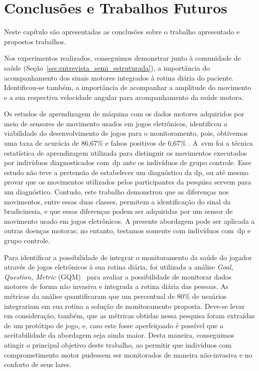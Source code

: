 \chapter{Conclusões e Trabalhos Futuros}\label{chapter:conclusoes_futuros}
Neste capítulo são apresentadas as conclusões sobre o trabalho apresentado e propostos trabalhos.  


Nos experimentos realizados, conseguimos demonstrar junto à comunidade de saúde (Seção~\ref{sec:entrevista_semi_estruturada}), a importância do acompanhamento dos sinais motores integrados à rotina diária do paciente. Identificou-se também, a importância de acompanhar a amplitude do movimento e a sua respectiva velocidade angular para acompanhamento da saúde motora.

Os estudos de aprendizagem de máquina com os dados motores adquiridos por meio de sensores de movimento usados em jogos eletrônicos, identificou a viabilidade do desenvolvimento de jogos para o monitoramento, pois, obtivemos uma taxa de acurácia de 86,67\% e falsos positivos de 6,67\% . A~\ac{svm} foi a técnica estatística de aprendizagem utilizada para distinguir os movimentos executados por indivíduos diagnosticados com~\ac{dp} ante os indivíduos de grupo controle. Esse estudo não teve a pretensão de estabelecer um diagnóstico da \ac{dp}, ou até mesmo provar que os movimentos utilizados pelos participantes da pesquisa servem para um diagnóstico. Contudo, este trabalho demonstrou que as diferenças nos movimentos, entre essas duas classes, permitem a identificação do sinal da bradicinesia, e que essas diferenças podem ser adquiridas por um sensor de movimento usado em jogos eletrônicos. A presente abordagem pode ser aplicada a outras doenças motoras; no entanto, testamos somente com indivíduos com~\ac{dp} e grupo controle.

Para identificar a possibilidade de integrar o monitoramento da saúde do jogador através de jogos eletrônicos à sua rotina diária, foi utilizada a análise \textit{Goal, Question, Metric} (GQM)~\cite{basili94} para avaliar a possibilidade de monitorar dados motores de forma não invasiva e integrada a rotina diária das pessoas. As métricas da análise quantificaram que um percentual de 80\% de usuários integrariam em sua rotina a solução de monitoramento proposta. Deve-se levar em consideração, também, que as métricas obtidas nessa pesquisa foram extraídas de um protótipo de jogo, e, caso este fosse aperfeiçoado é possível que a aceitabilidade da abordagem seja ainda maior. Desta maneira, conseguimos atingir o principal objetivo deste trabalho, ao permitir que indivíduos com comprometimento motor pudessem ser monitorados de maneira não-invasiva e no conforto de seus lares.




